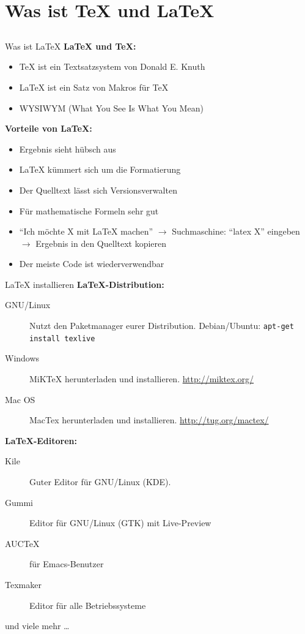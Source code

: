 \documentclass{beamer}
\newcommand{\slideheading}[1]{\textbf{#1}\\}
\begin{document}
		
	\section{Was ist \TeX{} und \LaTeX{}}
		\subsection*{}
		\begin{frame}{Was ist \LaTeX{}}
			\slideheading{\LaTeX{} und \TeX{}:}
			\begin{itemize}
				\item \TeX{} ist ein Textsatzsystem von Donald E. Knuth
				\item \LaTeX{} ist ein Satz von Makros für \TeX
				\item WYSIWYM (What You See Is What You Mean)
			\end{itemize}
			\vspace{0.2cm}
			\slideheading{Vorteile von \LaTeX{}:}
			\begin{itemize}
				\item Ergebnis sieht hübsch aus
				\item \LaTeX{} kümmert sich um die Formatierung
				\item Der Quelltext lässt sich Versionsverwalten
				\item Für mathematische Formeln sehr gut
				\item ``Ich möchte X mit \LaTeX{} machen'' $\rightarrow$
				Suchmaschine: ``latex X'' eingeben $\rightarrow$
				Ergebnis in den Quelltext kopieren
				\item Der meiste Code ist wiederverwendbar
			\end{itemize}
		\end{frame}
		
		
		\begin{frame}{\LaTeX{} installieren}
			\slideheading{\LaTeX-Distribution:}
			\begin{description}
				\item[GNU/Linux] Nutzt den Paketmanager eurer Distribution. Debian/Ubuntu: \texttt{apt-get install texlive} 
				\item[Windows] MiKTeX herunterladen und installieren. \url{http://miktex.org/}
				\item[Mac OS] MacTex herunterladen und installieren. \url{http://tug.org/mactex/} 
			\end{description}
			\slideheading{\LaTeX-Editoren:}
			\begin{description}
				\item[Kile] Guter Editor für GNU/Linux (KDE).
				\item[Gummi] Editor für GNU/Linux (GTK) mit Live-Preview
				\item[AUCTeX] für Emacs-Benutzer
				\item[Texmaker] Editor für alle Betriebssysteme
			\end{description}
			 und viele mehr \dots
		\end{frame}
		
\end{document}
